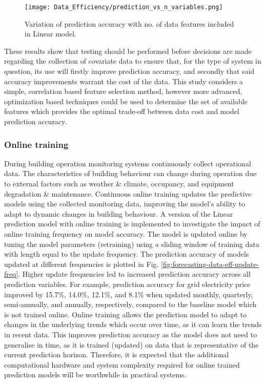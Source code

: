 \begin{figure}[h]
    \centering
    \texttt{[image: Data\_Efficiency/prediction\_vs\_n\_variables.png]}
    \caption{Variation of prediction accuracy with no. of data features included in Linear model.}
    \label{fig:forecasting-data-eff-n-variables}
\end{figure}

These results show that testing should be performed before decisions are made regarding the collection of covariate data to ensure that, for the type of system in question, its use will firstly improve prediction accuracy, and secondly that said accuracy improvements warrant the cost of the data. This study considers a simple, correlation based feature selection method, however more advanced, optimization based techniques \citep{gonzalez-vidal2019MethodologyEnergyMultivariate,kim2020ElectricityLoadForecasting} could be used to determine the set of available features which provides the optimal trade-off between data cost and model prediction accuracy.

\subsubsection{Online training} \label{sec:forecasting-online-training}


During building operation monitoring systems continuously collect operational data. The characteristics of building behaviour can change during operation due to external factors such as weather \& climate, occupancy, and equipment degradation \& maintenance. Continuous online training updates the predictive models using the collected monitoring data, improving the model's ability to adapt to dynamic changes in building behaviour. A version of the Linear prediction model with online training is implemented to investigate the impact of online training frequency on model accuracy. The model is updated online by tuning the model parameters (retraining) using a sliding window of training data with length equal to the update frequency.
The prediction accuracy of models updated at different frequencies is plotted in Fig. \ref{fig:forecasting-data-eff-update-freq}. Higher update frequencies led to increased prediction accuracy across all prediction variables. For example, prediction accuracy for grid electricity price improved by 15.7\%, 14.0\%, 12.1\%, and 8.1\% when updated monthly, quarterly, semi-annually, and annually, respectively, compared to the baseline model which is not trained online. Online training allows the prediction model to adapt to changes in the underlying trends which occur over time, as it can learn the trends in recent data. This improves prediction accuracy as the model does not need to generalise in time, as it is trained (updated) on data that is representative of the current prediction horizon.
Therefore, it is expected that the additional computational hardware and system complexity required for online trained prediction models will be worthwhile in practical systems.

